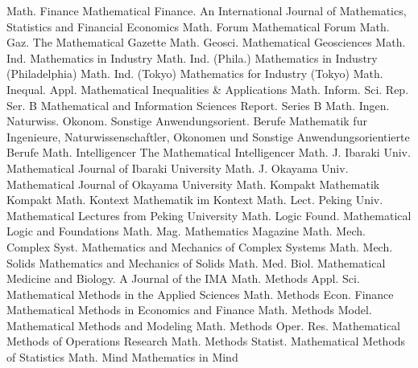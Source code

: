 {Math. Finance}
{Mathematical Finance. An International Journal of Mathematics, Statistics and Financial Economics}
{Math. Forum}
{Mathematical Forum}
{Math. Gaz.}
{The Mathematical Gazette}
{Math. Geosci.}
{Mathematical Geosciences}
{Math. Ind.}
{Mathematics in Industry}
{Math. Ind. (Phila.)}
{Mathematics in Industry (Philadelphia)}
{Math. Ind. (Tokyo)}
{Mathematics for Industry (Tokyo)}
{Math. Inequal. Appl.}
{Mathematical Inequalities & Applications}
{Math. Inform. Sci. Rep. Ser. B}
{Mathematical and Information Sciences Report. Series B}
{Math. Ingen. Naturwiss. Okonom. Sonstige Anwendungsorient. Berufe}
{Mathematik fur Ingenieure, Naturwissenschaftler, Okonomen und Sonstige Anwendungsorientierte Berufe}
{Math. Intelligencer}
{The Mathematical Intelligencer}
{Math. J. Ibaraki Univ.}
{Mathematical Journal of Ibaraki University}
{Math. J. Okayama Univ.}
{Mathematical Journal of Okayama University}
{Math. Kompakt}
{Mathematik Kompakt}
{Math. Kontext}
{Mathematik im Kontext}
{Math. Lect. Peking Univ.}
{Mathematical Lectures from Peking University}
{Math. Logic Found.}
{Mathematical Logic and Foundations}
{Math. Mag.}
{Mathematics Magazine}
{Math. Mech. Complex Syst.}
{Mathematics and Mechanics of Complex Systems}
{Math. Mech. Solids}
{Mathematics and Mechanics of Solids}
{Math. Med. Biol.}
{Mathematical Medicine and Biology. A Journal of the IMA}
{Math. Methods Appl. Sci.}
{Mathematical Methods in the Applied Sciences}
{Math. Methods Econ. Finance}
{Mathematical Methods in Economics and Finance}
{Math. Methods Model.}
{Mathematical Methods and Modeling}
{Math. Methods Oper. Res.}
{Mathematical Methods of Operations Research}
{Math. Methods Statist.}
{Mathematical Methods of Statistics}
{Math. Mind}
{Mathematics in Mind}
